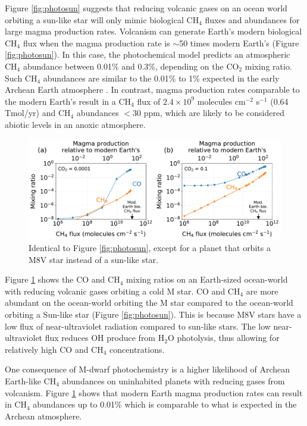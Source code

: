 Figure \ref{fig:photosun} suggests that reducing volcanic gases on an ocean world orbiting a sun-like star will only mimic biological CH$_4$ fluxes and abundances for large magma production rates. Volcanism can generate Earth’s modern biological CH$_4$ flux when the magma production rate is $\sim$50 times modern Earth’s (Figure \ref{fig:photosun}). In this case, the photochemical model predicts an atmospheric CH$_4$ abundance between 0.01\% and 0.3\%, depending on the CO$_2$ mixing ratio. Such CH$_4$ abundances are similar to the 0.01\% to 1\% expected in the early Archean Earth atmosphere \citep{Catling_2020}. In contrast, magma production rates comparable to the modern Earth's result in a CH$_4$ flux of $2.4\times 10^9$ molecules cm$^{-2}$ s$^{-1}$ (0.64 Tmol/yr) and CH$_4$ abundances $<30$ ppm, which are likely to be considered abiotic levels in an anoxic atmosphere.

\begin{figure}
  \centering
  \includegraphics[width=\textwidth]{tex/3methane/figures/Figure5.pdf}
  \caption{Identical to Figure \ref{fig:photosun}, except for a planet that orbits a M8V star instead of a sun-like star.}
  \label{fig:photoM}
\end{figure}

Figure \ref{fig:photoM} shows the CO and CH$_4$ mixing ratios on an Earth-sized ocean-world with reducing volcanic gases orbiting a cold M star. CO and CH$_4$ are more abundant on the ocean-world orbiting the M star compared to the ocean-world orbiting a Sun-like star (Figure \ref{fig:photosun}). This is because M8V stars have a low flux of near-ultraviolet radiation compared to sun-like stars. The low near-ultraviolet flux reduces OH produce from H$_2$O photolysis, thus allowing for relatively high CO and CH$_4$ concentrations. 

One consequence of M-dwarf photochemistry is a higher likelihood of Archean Earth-like CH$_4$ abundances on uninhabited planets with reducing gases from volcanism. Figure \ref{fig:photoM} shows that modern Earth magma production rates can result in CH$_4$ abundances up to 0.01\% which is comparable to what is expected in the Archean atmosphere. 

